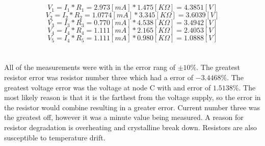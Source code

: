 \documentclass{article}
\begin{document}
\section{}

$$ V_1 = I_1 * R_1 =2.973 [mA] * 1.475 [K\Omega] = 4.3851 [V] $$
$$V_2 = I_2 * R_2 = 1.0774 [mA] *  3.345 [K\Omega]  = 3.6039 [V]$$
$$V_3 = I_3 * R_3 = 0.770 [mA] * 4.538 [K\Omega] = 3.4942 [V]$$
$$V_4 = I_4 * R_4 = 1.111 [mA] * 2.165 [K\Omega] = 2.4053 [V]$$
$$V_5 = I_4 * R_5 = 1.111 [mA] * 0.980 [K\Omega] = 1.0888 [V] $$

\section{}

All of the measurements were with in the error rang of $\pm 10\%$. The greatest resistor error was resistor number three which had a error of $-3.4468\%$.  The greatest voltage error was the voltage at node C with and error of $1.5138\%$. The most likely reason is that it is the farthest from the voltage supply, so the error in the resistor would combine resulting in a greater error. Current number three was the greatest off, however it was a minute value being measured.
A reason for resistor degradation is overheating and crystalline break down. Resistors are also susceptible to temperature drift. 
\end{document}
